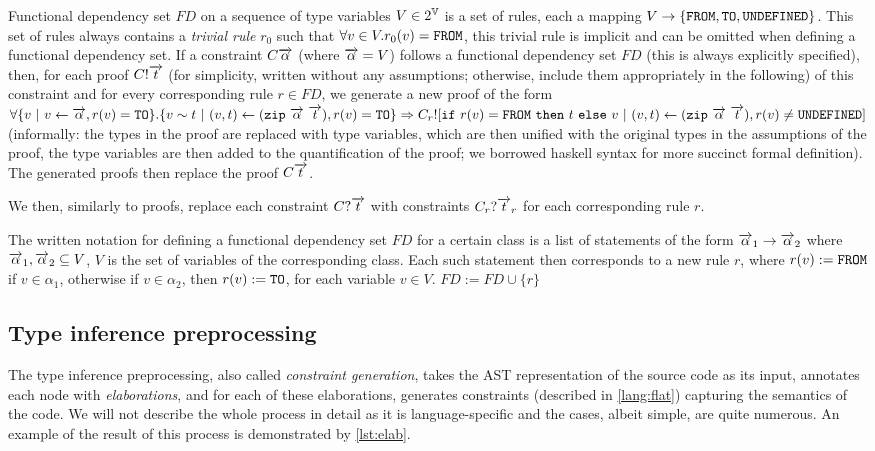 \begin{description}
    Functional dependency set $FD$ on a sequence of type variables $V \in 2^{\mathbb{V}}$ is a set of rules, each a mapping $V \to \{\mathtt{FROM}, \mathtt{TO}, \mathtt{UNDEFINED}\}$. This set of rules always contains a \emph{trivial rule} $r_0$ such that $\forall v \in V . r_0(v) = \mathtt{FROM}$, this trivial rule is implicit and can be omitted when defining a functional dependency set. If a constraint $C \overrightarrow{\alpha}$ (where $\overrightarrow{\alpha} = V$) follows a functional dependency set $FD$ (this is always explicitly specified), then, for each proof $C! \overrightarrow{t}$ (for simplicity, written without any assumptions; otherwise, include them appropriately in the following) of this constraint and for every corresponding rule $r \in FD$, we generate a new proof of the form $\forall \{v \ |\  v \gets \overrightarrow{\alpha}, r(v) = \mathtt{TO}\} . \{v \sim t \ |\  (v, t) \gets (\mathtt{zip}\ \overrightarrow{\alpha}\ \overrightarrow{t}), r(v) = \mathtt{TO} \} \Rightarrow C_r! [\mathtt{if}\ r(v) = \mathtt{FROM}\ \mathtt{then}\ t\ \mathtt{else}\ v \ |\  (v, t) \gets (\mathtt{zip}\ \overrightarrow{\alpha}\ \overrightarrow{t}), r(v) \neq \mathtt{UNDEFINED}]$ (informally: the  types in the proof are replaced with type variables, which are then unified with the original types in the assumptions of the proof, the type variables are then added to the quantification of the proof; we borrowed haskell syntax for more succinct formal definition). The generated proofs then replace the proof $C \overrightarrow{t}$.

    We then, similarly to proofs, replace each constraint $C? \overrightarrow{t}$ with constraints $C_r? \overrightarrow{t}_r$ for each corresponding rule $r$.

    The written notation for defining a functional dependency set $FD$ for a certain class is a list of statements of the form $\overrightarrow{\alpha}_1 \to \overrightarrow{\alpha}_2$ where $\overrightarrow{\alpha}_1, \overrightarrow{\alpha}_2 \subseteq V$, $V$ is the set of variables of the corresponding class. Each such statement then corresponds to a new rule $r$, where $r(v) := \mathtt{FROM}$ if $v \in \alpha_1$, otherwise if $v \in \alpha_2$, then $r(v) := \mathtt{TO}$, for each variable $v \in V$. $FD := FD \cup \{r\}$

\end{description}

\subsection{Type inference preprocessing}
\label{preprocessing}

The type inference preprocessing, also called \emph{constraint generation}, takes the AST representation of the source code as its input, annotates each node with \emph{elaborations}, and for each of these elaborations, generates constraints (described in \cref{lang:flat}) capturing the semantics of the code. We will not describe the whole process in detail as it is language-specific and the cases, albeit simple, are quite numerous. An example of the result of this process is demonstrated by \cref{lst:elab}.

